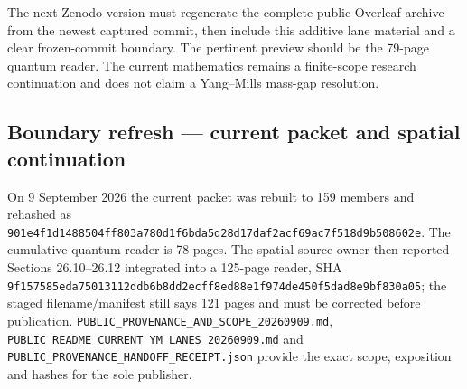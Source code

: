 The next Zenodo version must regenerate the complete public Overleaf
archive from the newest captured commit, then include this additive lane
material and a clear frozen-commit boundary. The pertinent preview
should be the 79-page quantum reader. The current mathematics remains a
finite-scope research continuation and does not claim a Yang--Mills
mass-gap resolution.

\subsection{Boundary refresh --- current packet and spatial
continuation}\label{zenodo-publication-boundary-20260909-md-boundary-refresh-current-packet-and-spatial-continuation}

On 9 September 2026 the current packet was rebuilt to 159 members and
rehashed as
\texttt{901e4f1d1488504ff803a780d1f6bda5d28d17daf2acf69ac7f518d9b508602e}.
The cumulative quantum reader is 78 pages. The spatial source owner then
reported Sections 26.10--26.12 integrated into a 125-page reader, SHA
\texttt{9f157585eda75013112ddb6b8dd2ecff8ed88e1f974de450f5dad8e9bf830a05};
the staged filename/manifest still says 121 pages and must be corrected
before publication.
\texttt{PUBLIC\_PROVENANCE\_AND\_SCOPE\_20260909.md},
\texttt{PUBLIC\_README\_CURRENT\_YM\_LANES\_20260909.md} and
\texttt{PUBLIC\_PROVENANCE\_HANDOFF\_RECEIPT.json} provide the exact
scope, exposition and hashes for the sole publisher.
